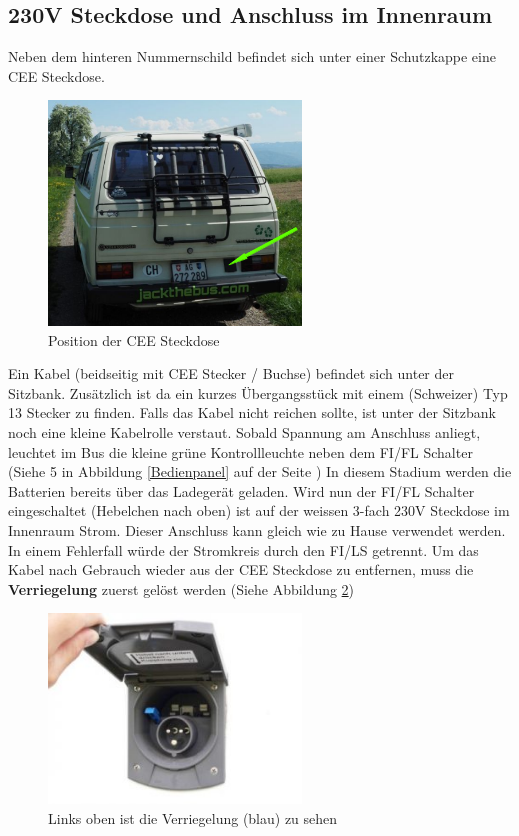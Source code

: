 \subsection{230V Steckdose und Anschluss im Innenraum}
Neben dem hinteren Nummernschild befindet sich unter einer Schutzkappe eine CEE Steckdose.

\begin{figure}[H]
	\centering
  \includegraphics[width=0.6\textwidth]{../Bilder/Anleitung/Steckdose.png}
	\caption{Position der CEE Steckdose}
    \label{Steckdose}
\end{figure}

Ein Kabel (beidseitig mit CEE Stecker / Buchse) befindet sich unter der Sitzbank.
Zusätzlich ist da ein kurzes Übergangsstück mit einem (Schweizer) Typ 13 Stecker zu finden.
Falls das Kabel nicht reichen sollte, ist unter der Sitzbank noch eine kleine Kabelrolle verstaut.
Sobald Spannung am Anschluss anliegt, leuchtet im Bus die kleine grüne Kontrollleuchte neben dem FI/FL Schalter (Siehe 5 in Abbildung \ref{Bedienpanel} auf der Seite \pageref{Bedienpanel})
In diesem Stadium werden die Batterien bereits über das Ladegerät geladen.
Wird nun der FI/FL Schalter eingeschaltet (Hebelchen nach oben) ist auf der weissen 3-fach 230V Steckdose im Innenraum Strom. 
Dieser Anschluss kann gleich wie zu Hause verwendet werden.
In einem Fehlerfall würde der Stromkreis durch den FI/LS getrennt.
Um das Kabel nach Gebrauch wieder aus der CEE Steckdose zu entfernen, muss die \textbf{Verriegelung} zuerst gelöst werden (Siehe Abbildung \ref{CEE})

\begin{figure}[H]
	\centering
  \includegraphics[width=0.6\textwidth]{../Bilder/Anleitung/CEE.jpg}
  \caption{Links oben ist die Verriegelung (blau) zu sehen}
    \label{CEE}
\end{figure}

